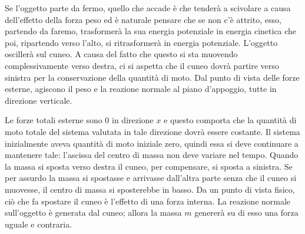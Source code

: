 \documentclass[10pt,a4paper]{book}
\begin{document}
\begin{figure}[htpb]
\end{figure}
\FloatBarrier
Se l'oggetto parte da fermo, quello che accade è che tenderà a scivolare a causa dell'effetto della forza peso ed è naturale pensare che se non c'è attrito, esso, partendo da faremo, trasformerà la sua energia potenziale in energia cinetica che poi, ripartendo verso l'alto, si ritrasformerà in energia potenziale. L'oggetto oscillerà sul cuneo. A causa del fatto che questo si sta muovendo complessivamente verso destra, ci si aspetta che il cuneo dovrà partire verso sinistra per la conservazione della quantità di moto. Dal punto di vista delle forze esterne, agiscono il peso e la reazione normale al piano d'appoggio, tutte in direzione verticale.

Le forze totali esterne sono $0$ in direzione $x$ e questo comporta che la quantità di moto totale del sistema valutata in tale direzione dovrà essere costante. Il sistema inizialmente aveva quantità di moto iniziale zero, quindi essa si deve continuare a mantenere tale: l'ascissa del centro di massa non deve variare nel tempo. Quando la massa si sposta verso destra il cuneo, per compensare, si sposta a sinistra. Se per assurdo la massa si spostasse e arrivasse dall'altra parte senza che il cuneo si muovesse, il centro di massa si sposterebbe in basso. Da un punto di vista fisico, ciò che fa spostare il cuneo è l'effetto di una forza interna. La reazione normale sull'oggetto è generata dal cuneo; allora la massa $m$ genererà su di esso una forza uguale e contraria.
\end{document}
